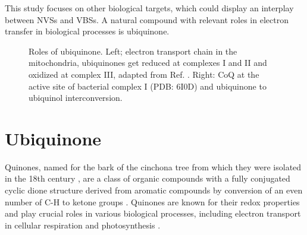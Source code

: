This study focuses on other biological targets, which could display an interplay between NVSs and VBSs. A natural compound with relevant roles in electron transfer in biological processes is ubiquinone.

\begin{figure}[ht!]
  \centering
  \caption[Role of ubiquinone]{Roles of ubiquinone. Left; electron transport chain in the mitochondria, ubiquinones get reduced at complexes I and II and oxidized at complex III, adapted from Ref. . Right: CoQ at the active site of bacterial complex I (PDB: 6I0D) \cite{gutierrez2020key} and ubiquinone to ubiquinol interconversion.}
  \label{fig:ETC}
\end{figure}

\section{Ubiquinone}
Quinones, named for the bark of the cinchona tree from which they were isolated in the 18th century \cite{rusell1873quinone}, are a class of organic compounds with a fully conjugated cyclic dione structure derived from aromatic compounds by conversion of an even number of C-H to ketone groups \cite{IUPACQ050152025}. Quinones are known for their redox properties and play crucial roles in various biological processes, including electron transport in cellular respiration and photosynthesis \cite{ernster1995biochemical,chen2024low}.

